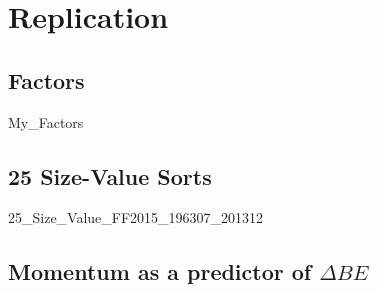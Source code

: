 
\section{Replication} \label{sec:repl}

\subsection{\textcite{fama2016dissecting, fama2016choosing} Factors} \label{sec:repl.FF2016}

{My_Factors}

\subsection{\textcite{fama2015five} 25 Size-Value Sorts}


{25_Size_Value_FF2015_196307_201312}


\subsection{\textcite{asness2013devil} Momentum as a predictor of $\Delta BE$}
